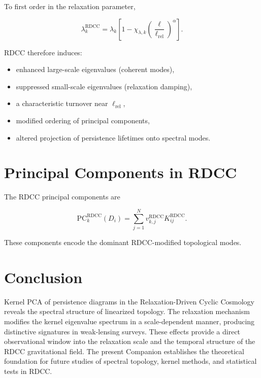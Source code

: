 \documentclass[11pt,a4paper]{article}
\begin{document}
To first order in the relaxation parameter,

\begin{equation}
    \lambda^{\mathrm{RDCC}}_{k}
    = \lambda_{k}
      \left[
        1 - \chi_{\lambda,k}
        \left(\frac{\ell}{\ell_{\mathrm{rel}}}\right)^{\alpha}
      \right].
\end{equation}

RDCC therefore induces:

\begin{itemize}
    \item enhanced large-scale eigenvalues (coherent modes),
    \item suppressed small-scale eigenvalues (relaxation damping),
    \item a characteristic turnover near $\ell_{\mathrm{rel}}$,
    \item modified ordering of principal components,
    \item altered projection of persistence lifetimes onto spectral modes.
\end{itemize}
\section{Principal Components in RDCC}

The RDCC principal components are

\begin{equation}
    \mathrm{PC}^{\mathrm{RDCC}}_{k}(D_{i})
    = \sum_{j=1}^{N}
      v^{\mathrm{RDCC}}_{k,j}
      K^{\mathrm{RDCC}}_{ij}.
\end{equation}

These components encode the dominant RDCC-modified topological modes.
\section{Conclusion}

Kernel PCA of persistence diagrams in the Relaxation-Driven Cyclic Cosmology 
reveals the spectral structure of linearized topology. The relaxation mechanism 
modifies the kernel eigenvalue spectrum in a scale-dependent manner, producing 
distinctive signatures in weak-lensing surveys. These effects provide a direct 
observational window into the relaxation scale and the temporal structure of the 
RDCC gravitational field. The present Companion establishes the theoretical 
foundation for future studies of spectral topology, kernel methods, and 
statistical tests in RDCC.


\nocite{*}

\end{document}

